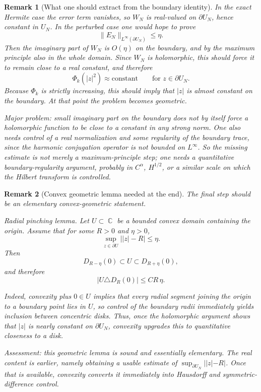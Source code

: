 \documentclass[a4paper,11pt,reqno]{amsart}
\newtheorem{remark}{Remark}[section]
\DeclareMathOperator{\C}{\mathbb{C}}
\begin{document}
\begin{remark}[What one should extract from the boundary identity]
In the exact Hermite case the error term vanishes, so \(W_N\) is real-valued on
\(\partial U_N\), hence constant in \(U_N\). In the perturbed case one would
hope to prove
\[
\|E_N\|_{L^\infty(\partial U_N)}\leq \eta.
\]
Then the imaginary part of \(W_N\) is \(O(\eta)\) on the boundary, and by the
maximum principle also in the whole domain. Since \(W_N\) is holomorphic, this
should force it to remain close to a real constant, and therefore
\[
\Phi_k(|z|^2)\approx \text{constant}
\qquad\text{for } z\in\partial U_N.
\]
Because \(\Phi_k\) is strictly increasing, this should imply that \(|z|\) is
almost constant on the boundary. At that point the problem becomes geometric.

Major problem: small imaginary part on the boundary does \emph{not} by itself
force a holomorphic function to be close to a constant in any strong norm. One
also needs control of a real normalization and some regularity of the boundary
trace, since the harmonic conjugation operator is not bounded on \(L^\infty\).
So the missing estimate is not merely a maximum-principle step; one needs a
quantitative boundary-regularity argument, probably in \(C^\alpha\),
\(H^{1/2}\), or a similar scale on which the Hilbert transform is controlled.
\end{remark}

\begin{remark}[Convex geometric lemma needed at the end]
The final step should be an elementary convex-geometric statement.

\smallskip
\emph{Radial pinching lemma.}
Let \(U\subset\C\) be a bounded convex domain containing the origin. Assume that
for some \(R>0\) and \(\eta>0\),
\[
\sup_{z\in\partial U}\big||z|-R\big|\leq \eta.
\]
Then
\[
D_{R-\eta}(0)\subset U\subset D_{R+\eta}(0),
\]
and therefore
\[
|U\triangle D_R(0)|\leq C R\,\eta.
\]

\smallskip
Indeed, convexity plus \(0\in U\) implies that every radial segment joining the
origin to a boundary point lies in \(U\), so control of the boundary radii
immediately yields inclusion between concentric disks. Thus, once the holomorphic
argument shows that \(|z|\) is nearly constant on \(\partial U_N\), convexity
upgrades this to quantitative closeness to a disk.

Assessment: this geometric lemma is sound and essentially elementary. The real
content is earlier, namely obtaining a usable estimate of
\(\sup_{\partial U_N}||z|-R|\). Once that is available, convexity converts it
immediately into Hausdorff and symmetric-difference control.
\end{remark}
\end{document}
